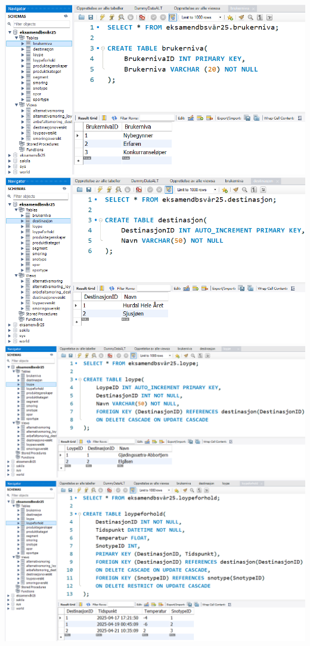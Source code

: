\documentclass[12pt, a4paper]{article}
\begin{document}
\includegraphics[width=\textwidth]{brukerniva.png}
\includegraphics[width=\textwidth]{destinasjon.png}
\includegraphics[width=\textwidth]{loype.png}
\includegraphics[width=\textwidth]{loypeforhold.png}
\end{document}
